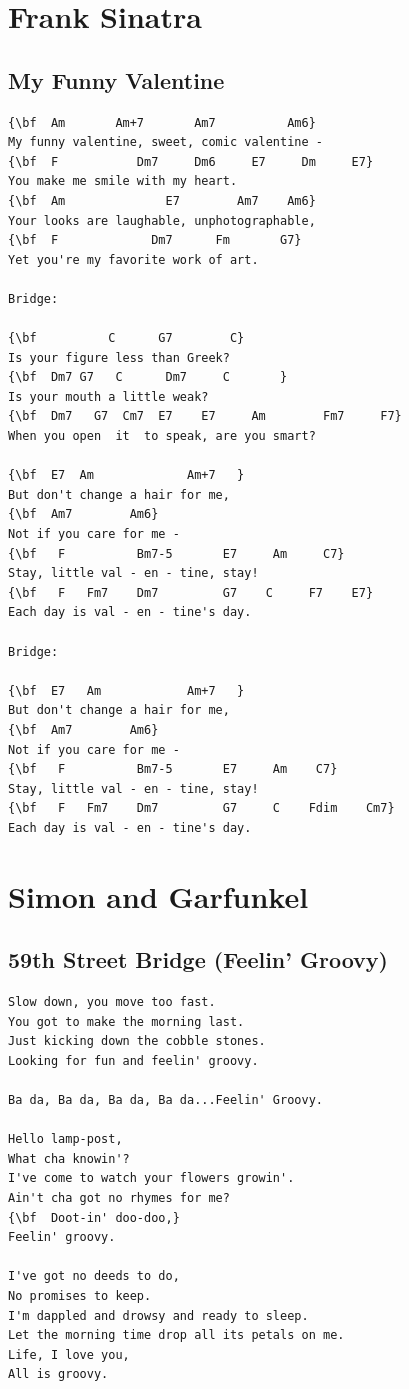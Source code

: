 \documentclass[a4paper]{article}
\begin{document}
\section{Frank Sinatra}
\subsection{My Funny Valentine}
\begin{Verbatim}[commandchars=\\\{\}]
{\bf  Am       Am+7       Am7          Am6}
My funny valentine, sweet, comic valentine -
{\bf  F           Dm7     Dm6     E7     Dm     E7}
You make me smile with my heart.
{\bf  Am              E7        Am7    Am6}
Your looks are laughable, unphotographable,
{\bf  F             Dm7      Fm       G7}
Yet you're my favorite work of art.

Bridge:

{\bf          C      G7        C}
Is your figure less than Greek?
{\bf  Dm7 G7   C      Dm7     C       }
Is your mouth a little weak?
{\bf  Dm7   G7  Cm7  E7    E7     Am        Fm7     F7}
When you open  it  to speak, are you smart?

{\bf  E7  Am             Am+7   }
But don't change a hair for me,
{\bf  Am7        Am6}
Not if you care for me -
{\bf   F          Bm7-5       E7     Am     C7}
Stay, little val - en - tine, stay!
{\bf   F   Fm7    Dm7         G7    C     F7    E7}
Each day is val - en - tine's day.

Bridge:

{\bf  E7   Am            Am+7   }
But don't change a hair for me,
{\bf  Am7        Am6}
Not if you care for me -
{\bf   F          Bm7-5       E7     Am    C7}
Stay, little val - en - tine, stay!
{\bf   F   Fm7    Dm7         G7     C    Fdim    Cm7}
Each day is val - en - tine's day.

\end{Verbatim}
\newpage
\section{Simon and Garfunkel}
\subsection{59th Street Bridge (Feelin' Groovy)}
\begin{Verbatim}[commandchars=\\\{\}]
Slow down, you move too fast.
You got to make the morning last.
Just kicking down the cobble stones.
Looking for fun and feelin' groovy.

Ba da, Ba da, Ba da, Ba da...Feelin' Groovy.

Hello lamp-post,
What cha knowin'?
I've come to watch your flowers growin'.
Ain't cha got no rhymes for me?
{\bf  Doot-in' doo-doo,}
Feelin' groovy.

I've got no deeds to do,
No promises to keep.
I'm dappled and drowsy and ready to sleep.
Let the morning time drop all its petals on me.
Life, I love you,
All is groovy.

\end{Verbatim}
\newpage
\end{document}
